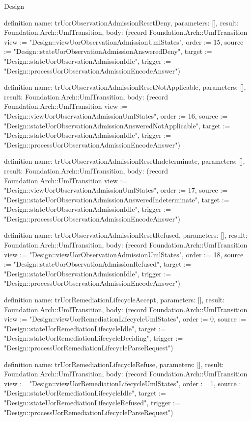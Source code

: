 \begin{lexlean}{Design}
\begin{semanticmodule}
definition{
  name: trUorObservationAdmissionResetDeny,
  parameters: [],
  result: Foundation.Arch::UmlTransition,
  body: (record Foundation.Arch::UmlTransition {view := "Design::viewUorObservationAdmissionUmlStates", order := 15, source := "Design::stateUorObservationAdmissionAnsweredDeny", target := "Design::stateUorObservationAdmissionIdle", trigger := "Design::processUorObservationAdmissionEncodeAnswer"})
}

definition{
  name: trUorObservationAdmissionResetNotApplicable,
  parameters: [],
  result: Foundation.Arch::UmlTransition,
  body: (record Foundation.Arch::UmlTransition {view := "Design::viewUorObservationAdmissionUmlStates", order := 16, source := "Design::stateUorObservationAdmissionAnsweredNotApplicable", target := "Design::stateUorObservationAdmissionIdle", trigger := "Design::processUorObservationAdmissionEncodeAnswer"})
}

definition{
  name: trUorObservationAdmissionResetIndeterminate,
  parameters: [],
  result: Foundation.Arch::UmlTransition,
  body: (record Foundation.Arch::UmlTransition {view := "Design::viewUorObservationAdmissionUmlStates", order := 17, source := "Design::stateUorObservationAdmissionAnsweredIndeterminate", target := "Design::stateUorObservationAdmissionIdle", trigger := "Design::processUorObservationAdmissionEncodeAnswer"})
}

definition{
  name: trUorObservationAdmissionResetRefused,
  parameters: [],
  result: Foundation.Arch::UmlTransition,
  body: (record Foundation.Arch::UmlTransition {view := "Design::viewUorObservationAdmissionUmlStates", order := 18, source := "Design::stateUorObservationAdmissionRefused", target := "Design::stateUorObservationAdmissionIdle", trigger := "Design::processUorObservationAdmissionEncodeAnswer"})
}

definition{
  name: trUorRemediationLifecycleAccept,
  parameters: [],
  result: Foundation.Arch::UmlTransition,
  body: (record Foundation.Arch::UmlTransition {view := "Design::viewUorRemediationLifecycleUmlStates", order := 0, source := "Design::stateUorRemediationLifecycleIdle", target := "Design::stateUorRemediationLifecycleDeciding", trigger := "Design::processUorRemediationLifecycleParseRequest"})
}

definition{
  name: trUorRemediationLifecycleRefuse,
  parameters: [],
  result: Foundation.Arch::UmlTransition,
  body: (record Foundation.Arch::UmlTransition {view := "Design::viewUorRemediationLifecycleUmlStates", order := 1, source := "Design::stateUorRemediationLifecycleIdle", target := "Design::stateUorRemediationLifecycleRefused", trigger := "Design::processUorRemediationLifecycleParseRequest"})
}


\end{semanticmodule}
\end{lexlean}

